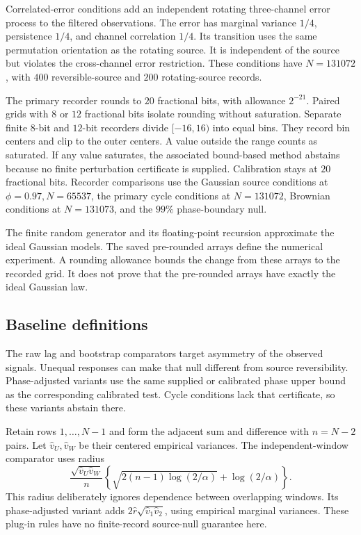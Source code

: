 Correlated-error conditions add an independent rotating three-channel error process to the filtered observations. The error has marginal variance $1/4$, persistence $1/4$, and channel correlation $1/4$. Its transition uses the same permutation orientation as the rotating source. It is independent of the source but violates the cross-channel error restriction. These conditions have $N=131072$, with $400$ reversible-source and $200$ rotating-source records.

The primary recorder rounds to $20$ fractional bits, with allowance $2^{-21}$. Paired grids with $8$ or $12$ fractional bits isolate rounding without saturation. Separate finite $8$-bit and $12$-bit recorders divide $[-16,16)$ into equal bins. They record bin centers and clip to the outer centers. A value outside the range counts as saturated. If any value saturates, the associated bound-based method abstains because no finite perturbation certificate is supplied. Calibration stays at $20$ fractional bits. Recorder comparisons use the Gaussian source conditions at $\phi=0.97,N=65537$, the primary cycle conditions at $N=131072$, Brownian conditions at $N=131073$, and the $99\%$ phase-boundary null.

The finite random generator and its floating-point recursion approximate the ideal Gaussian models. The saved pre-rounded arrays define the numerical experiment. A rounding allowance bounds the change from these arrays to the recorded grid. It does not prove that the pre-rounded arrays have exactly the ideal Gaussian law.

\subsection{Baseline definitions}\label{study16:baselines}
The raw lag and bootstrap comparators target asymmetry of the observed signals. Unequal responses can make that null different from source reversibility. Phase-adjusted variants use the same supplied or calibrated phase upper bound as the corresponding calibrated test. Cycle conditions lack that certificate, so these variants abstain there.

Retain rows $1,\ldots,N-1$ and form the adjacent sum and difference with $n=N-2$ pairs. Let $\widehat v_U,\widehat v_W$ be their centered empirical variances. The independent-window comparator uses radius
\[
 \frac{\sqrt{\widehat v_U\widehat v_W}}{n}
 \left\{\sqrt{2(n-1)\log(2/\alpha)}+\log(2/\alpha)\right\}.
\]
This radius deliberately ignores dependence between overlapping windows. Its phase-adjusted variant adds $2\widehat r\sqrt{\widehat v_1\widehat v_2}$, using empirical marginal variances. These plug-in rules have no finite-record source-null guarantee here.


